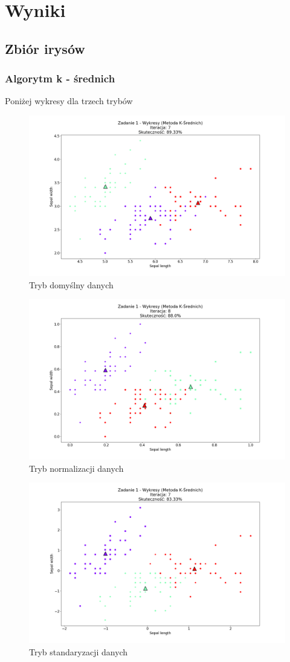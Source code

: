 \documentclass{classrep}
\begin{document}
\section{Wyniki}
{
	\subsection{Zbiór irysów}
	{
		\subsubsection{Algorytm k - średnich}
		{
			Poniżej wykresy dla trzech trybów
				\begin{figure}[!htbp]
					\centering
					\includegraphics[width=\textwidth,width=95mm]{wykresy/plot_k_meansIrisDefault.png}
					\caption{Tryb domyślny danych}
				\end{figure}
			
				\begin{figure}[!htbp]
					\centering
					\includegraphics[width=\textwidth,width=95mm]{wykresy/plot_k_meansIrisNormalized.png}
					\caption{Tryb normalizacji danych}
				\end{figure}
		
				\begin{figure}[!htbp]
					\centering
					\includegraphics[width=\textwidth,width=95mm]{wykresy/plot_k_meansIrisStandadise.png}
					\caption{Tryb standaryzacji danych}
				\end{figure}
			\FloatBarrier
		}

}}
\end{document}
